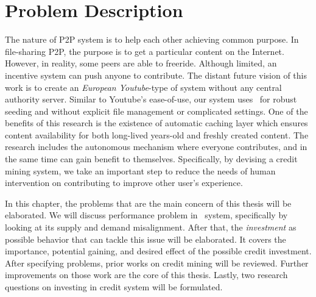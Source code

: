 \chapter{Problem Description}
\label{chp:relwork}
The nature of P2P system is to help each other achieving common purpose. In file-sharing P2P, the purpose is to get a particular content on the Internet. However, in reality, some peers are able to freeride. Although limited, an incentive system can push anyone to contribute. The distant future vision of this work is to create an \textit{European Youtube}-type of system without any central authority server. Similar to Youtube's ease-of-use, our system uses \bt~for robust seeding and without explicit file management or complicated settings. One of the benefits of this research is the existence of automatic caching layer which ensures content availability for both long-lived years-old and freshly created content. The research includes the autonomous mechanism where everyone contributes, and in the same time can gain benefit to themselves. Specifically, by devising a credit mining system, we take an important step to reduce the needs of human intervention on contributing to improve other user's experience.

In this chapter, the problems that are the main concern of this thesis will be elaborated. We will discuss performance problem in \bt~system, specifically by looking at its supply and demand misalignment. After that, the \textit{investment} as possible behavior that can tackle this issue will be elaborated. It covers the importance, potential gaining, and desired effect of the possible credit investment. After specifying problems, prior works on credit mining will be reviewed. Further improvements on those work are the core of this thesis. Lastly, two research questions on investing in credit system will be formulated.
 

